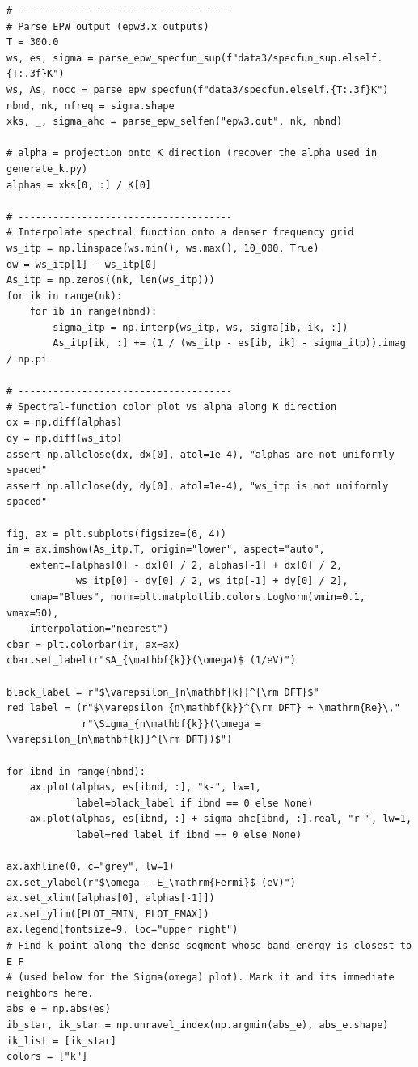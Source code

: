 \documentclass[a4paper,11pt,serif]{article}
\begin{document}
\begin{scriptsize}
\begin{Verbatim}[frame=single]
# -------------------------------------
# Parse EPW output (epw3.x outputs)
T = 300.0
ws, es, sigma = parse_epw_specfun_sup(f"data3/specfun_sup.elself.{T:.3f}K")
ws, As, nocc = parse_epw_specfun(f"data3/specfun.elself.{T:.3f}K")
nbnd, nk, nfreq = sigma.shape
xks, _, sigma_ahc = parse_epw_selfen("epw3.out", nk, nbnd)

# alpha = projection onto K direction (recover the alpha used in generate_k.py)
alphas = xks[0, :] / K[0]

# -------------------------------------
# Interpolate spectral function onto a denser frequency grid
ws_itp = np.linspace(ws.min(), ws.max(), 10_000, True)
dw = ws_itp[1] - ws_itp[0]
As_itp = np.zeros((nk, len(ws_itp)))
for ik in range(nk):
    for ib in range(nbnd):
        sigma_itp = np.interp(ws_itp, ws, sigma[ib, ik, :])
        As_itp[ik, :] += (1 / (ws_itp - es[ib, ik] - sigma_itp)).imag / np.pi

# -------------------------------------
# Spectral-function color plot vs alpha along K direction
dx = np.diff(alphas)
dy = np.diff(ws_itp)
assert np.allclose(dx, dx[0], atol=1e-4), "alphas are not uniformly spaced"
assert np.allclose(dy, dy[0], atol=1e-4), "ws_itp is not uniformly spaced"

fig, ax = plt.subplots(figsize=(6, 4))
im = ax.imshow(As_itp.T, origin="lower", aspect="auto",
    extent=[alphas[0] - dx[0] / 2, alphas[-1] + dx[0] / 2,
            ws_itp[0] - dy[0] / 2, ws_itp[-1] + dy[0] / 2],
    cmap="Blues", norm=plt.matplotlib.colors.LogNorm(vmin=0.1, vmax=50),
    interpolation="nearest")
cbar = plt.colorbar(im, ax=ax)
cbar.set_label(r"$A_{\mathbf{k}}(\omega)$ (1/eV)")

black_label = r"$\varepsilon_{n\mathbf{k}}^{\rm DFT}$"
red_label = (r"$\varepsilon_{n\mathbf{k}}^{\rm DFT} + \mathrm{Re}\,"
             r"\Sigma_{n\mathbf{k}}(\omega = \varepsilon_{n\mathbf{k}}^{\rm DFT})$")

for ibnd in range(nbnd):
    ax.plot(alphas, es[ibnd, :], "k-", lw=1,
            label=black_label if ibnd == 0 else None)
    ax.plot(alphas, es[ibnd, :] + sigma_ahc[ibnd, :].real, "r-", lw=1,
            label=red_label if ibnd == 0 else None)

ax.axhline(0, c="grey", lw=1)
ax.set_ylabel(r"$\omega - E_\mathrm{Fermi}$ (eV)")
ax.set_xlim([alphas[0], alphas[-1]])
ax.set_ylim([PLOT_EMIN, PLOT_EMAX])
ax.legend(fontsize=9, loc="upper right")
# Find k-point along the dense segment whose band energy is closest to E_F
# (used below for the Sigma(omega) plot). Mark it and its immediate neighbors here.
abs_e = np.abs(es)
ib_star, ik_star = np.unravel_index(np.argmin(abs_e), abs_e.shape)
ik_list = [ik_star]
colors = ["k"]



\end{Verbatim}
\end{scriptsize}
\end{document}
